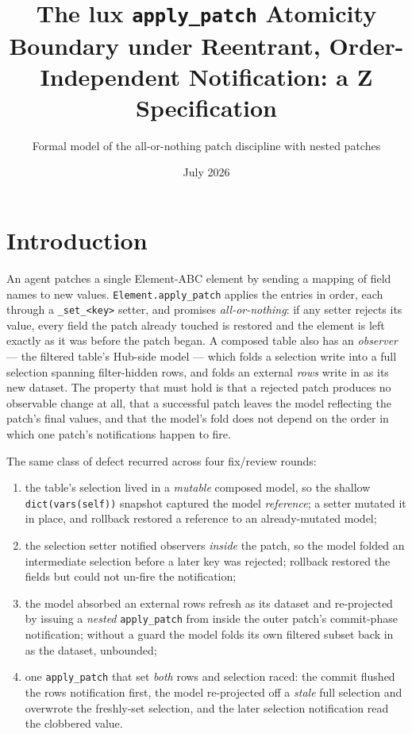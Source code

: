 \documentclass[a4paper,10pt,fleqn]{article}
\begin{document}
\title{The lux \texttt{apply\_patch} Atomicity Boundary under Reentrant,
Order-Independent Notification: a Z Specification}
\author{Formal model of the all-or-nothing patch discipline with nested patches}
\date{July 2026}
\maketitle

\section{Introduction}

An agent patches a single Element-ABC element by sending a mapping of field
names to new values.  \texttt{Element.apply\_patch} applies the entries in
order, each through a \texttt{\_set\_<key>} setter, and promises
\emph{all-or-nothing}: if any setter rejects its value, every field the patch
already touched is restored and the element is left exactly as it was before the
patch began.  A composed table also has an \emph{observer} --- the filtered
table's Hub-side model --- which folds a selection write into a full selection
spanning filter-hidden rows, and folds an external \emph{rows} write in as its
new dataset.  The property that must hold is that a rejected patch produces no
observable change at all, that a successful patch leaves the model reflecting the
patch's final values, and that the model's fold does not depend on the order in
which one patch's notifications happen to fire.

The same class of defect recurred across four fix/review rounds:

\begin{enumerate}
  \item the table's selection lived in a \emph{mutable} composed model, so the
    shallow \texttt{dict(vars(self))} snapshot captured the model
    \emph{reference}; a setter mutated it in place, and rollback restored a
    reference to an already-mutated model;
  \item the selection setter notified observers \emph{inside} the patch, so the
    model folded an intermediate selection before a later key was rejected;
    rollback restored the fields but could not un-fire the notification;
  \item the model absorbed an external rows refresh as its dataset and
    re-projected by issuing a \emph{nested} \texttt{apply\_patch} from inside the
    outer patch's commit-phase notification; without a guard the model folds its
    own filtered subset back in as the dataset, unbounded;
  \item one \texttt{apply\_patch} that set \emph{both} rows and selection raced:
    the commit flushed the rows notification first, the model re-projected off a
    \emph{stale} full selection and overwrote the freshly-set selection, and the
    later selection notification read the clobbered value.
\end{enumerate}
\end{document}
